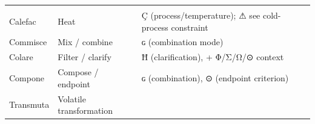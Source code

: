 \documentclass[12pt,a4paper]{article}
\begin{document}
\begin{longtable}[]{@{}lll@{}}
\begin{minipage}[t]{0.30\columnwidth}
\end{minipage}\tabularnewline
\begin{minipage}[t]{0.30\columnwidth}\raggedright
Calefac\strut
\end{minipage} & \begin{minipage}[t]{0.30\columnwidth}\raggedright
Heat\strut
\end{minipage} & \begin{minipage}[t]{0.30\columnwidth}\raggedright
Ç (process/temperature); ⚠ see cold-process constraint\strut
\end{minipage}\tabularnewline
\begin{minipage}[t]{0.30\columnwidth}\raggedright
Commisce\strut
\end{minipage} & \begin{minipage}[t]{0.30\columnwidth}\raggedright
Mix / combine\strut
\end{minipage} & \begin{minipage}[t]{0.30\columnwidth}\raggedright
ɢ (combination mode)\strut
\end{minipage}\tabularnewline
\begin{minipage}[t]{0.30\columnwidth}\raggedright
Colare\strut
\end{minipage} & \begin{minipage}[t]{0.30\columnwidth}\raggedright
Filter / clarify\strut
\end{minipage} & \begin{minipage}[t]{0.30\columnwidth}\raggedright
Ħ (clarification), + Φ/Σ/Ω/⊙ context\strut
\end{minipage}\tabularnewline
\begin{minipage}[t]{0.30\columnwidth}\raggedright
Compone\strut
\end{minipage} & \begin{minipage}[t]{0.30\columnwidth}\raggedright
Compose / endpoint\strut
\end{minipage} & \begin{minipage}[t]{0.30\columnwidth}\raggedright
ɢ (combination), ⊙ (endpoint criterion)\strut
\end{minipage}\tabularnewline
\begin{minipage}[t]{0.30\columnwidth}\raggedright
Transmuta\strut
\end{minipage} & \begin{minipage}[t]{0.30\columnwidth}\raggedright
Volatile transformation\strut
\end{minipage} & \begin{minipage}[t]{0.30\columnwidth}\raggedright

\end{minipage}
\end{longtable}
\end{document}
